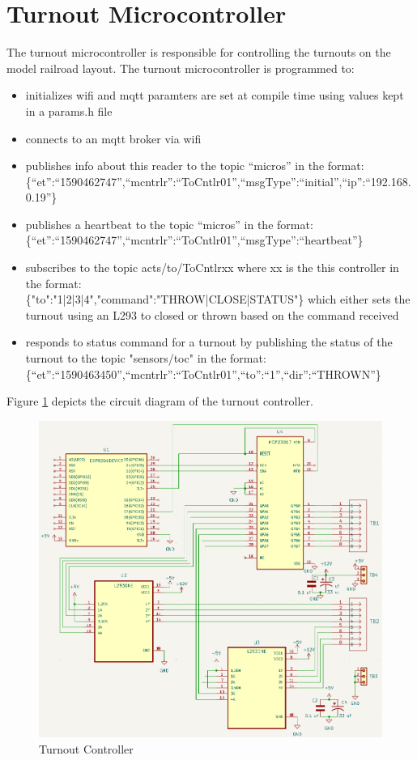 \section{Turnout Microcontroller}
\label{sec:turnout-microcontroller}
The turnout microcontroller is responsible for controlling the turnouts on the model railroad layout. The turnout microcontroller is programmed to:
\begin{itemize}
    \item initializes \gls{wifi} and \gls{mqtt} paramters are set at compile time using values kept in a params.h file
    \item connects to an \gls{mqtt} broker via \gls{wifi}
    \item publishes info about this reader to the topic ``micros'' in the format: \\
    \{``et'':``1590462747'',``mcntrlr'':``ToCntlr01'',``msgType'':``initial'',``ip'':``192.168.0.19''\}
    \item publishes a heartbeat to the topic ``micros'' in the format: \\
    \{``et'':``1590462747'',``mcntrlr'':``ToCntlr01'',``msgType'':``heartbeat''\}
    \item subscribes to the topic acts/to/ToCntlrxx where xx is the this controller in the format: \\
    \{"to":"1|2|3|4","command":"THROW|CLOSE|STATUS"\} which either sets the turnout using an L293 to closed or thrown based on the command received
    \item responds to status command for a turnout by publishing the status of the turnout to the topic "sensors/toc" in the format: \\
    \{``et'':``1590463450'',``mcntrlr'':``ToCntlr01'',``to'':``1'',``dir'':``THROWN''\}
\end{itemize}

Figure \ref{fig:turnout-controller} depicts the circuit diagram of the turnout controller.

\begin{figure}[htbp]
    \centering
    \includegraphics[width=\textwidth]{turnout-controller.png}
    \caption{Turnout Controller}
    \label{fig:turnout-controller}
\end{figure}